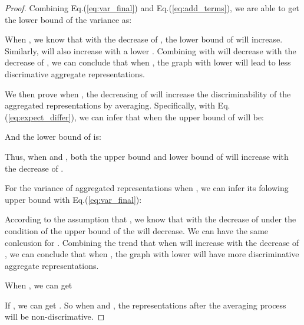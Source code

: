 \begin{proof}
Combining Eq.(\ref{eq:var_final}) and Eq.(\ref{eq:add_terms}), we are able to get the lower bound of the variance as:

When , we know that with the decrease of , the lower bound of  will increase. Similarly,   will also increase with a lower . Combining with  will decrease with the decrease of , we can conclude that when , the graph with lower  will lead to less discrimative aggregate representations. 



We then prove when , the decreasing of  will increase the discriminability of the aggregated representations by averaging. Specifically, with Eq.(\ref{eq:expect_differ}), we can infer that when  the upper bound of  will be:



And the lower bound of  is:

Thus, when  and ,  both the upper bound and lower bound of  will increase with the decrease of .

For the variance of aggregated representations when , we can infer its folowing upper bound with Eq.(\ref{eq:var_final}):

According to the assumption that , we know that with the decrease of  under the condition of  the upper bound of the  will decrease. We can have the same conlcusion for . Combining the trend that when   will increase with the decrease of , we can conclude that when , the graph with lower  will have more discriminative aggregate representations. 

When , we can get


If , we can get . So when  and  , the representations after the averaging process will be non-discrimative.

\end{proof}



